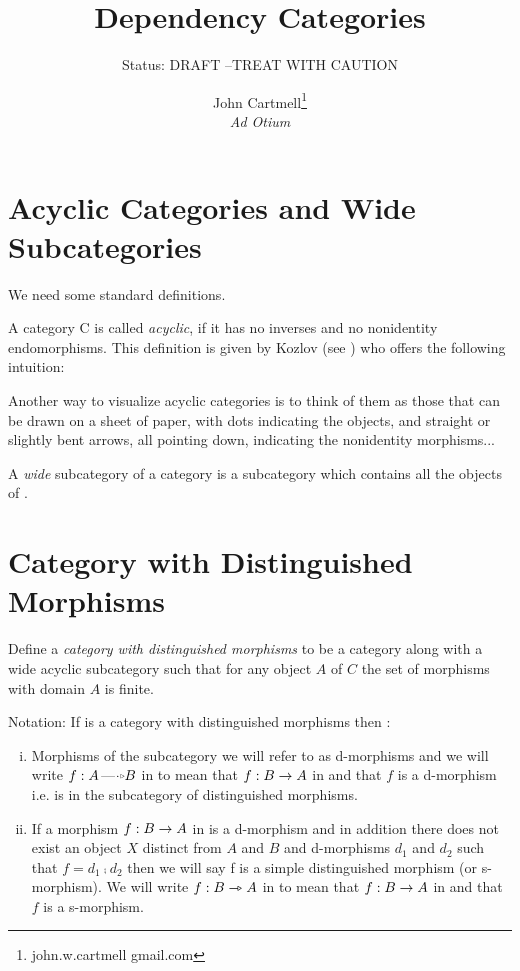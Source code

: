 \documentclass[10pt,a4paper]{scrartcl}
\title{Dependency Categories}
\author{John Cartmell\footnote{john.w.cartmell gmail.com}\\ \normalsize{\textit{Ad Otium}}}
\subtitle{Status: \normalsize{DRAFT --TREAT WITH CAUTION}}
\begin{document}
\maketitle

\section {Acyclic Categories and Wide Subcategories}
We need some standard definitions.

A category C is called \textit{acyclic}, if it has no inverses and no nonidentity
endomorphisms. This definition is given by Kozlov (see \cite{Kozlov2007}) who offers the following intuition:
\begin{erquote}
Another way to visualize acyclic categories is to think of them as those
that can be drawn on a sheet of paper, with dots indicating the objects, and
straight or slightly bent arrows, all pointing down, indicating the nonidentity
morphisms...
\end{erquote}
\noindent
A \textit{wide} subcategory of a category  is a subcategory which contains all the objects of .

\section{Category with Distinguished Morphisms}

\begin{definition}
Define a \textit{category with distinguished morphisms} to be a category  along with a wide acyclic subcategory  such that for any object $A$ of $C$ the set of morphisms with domain $A$ is finite.
\end{definition} 

\noindent
Notation:
If  is a category with distinguished morphisms then :
\begin{enumerate}[(i)]
\item Morphisms of the subcategory we will refer to as d-morphisms and we will write  
$f: A \dmorph B$ in 
to mean that 
$f: B \rightarrow A$ in  and that $f$ is a d-morphism i.e. is in the subcategory  of distinguished morphisms. 
\item If a morphism $f: B \rightarrow A$ in  is a d-morphism and in addition
there does not exist an object $X$ distinct from $A$ and $B$ and d-morphisms $d_1$ and $d_2$
such that $f=d_1 \comp d_2$ then we will say f is a simple distinguished morphism (or s-morphism). We will write  $f:B \rightarrowtriangle A$ in 
to mean that 
$f: B \rightarrow A$ in  and that $f$ is a s-morphism.
\end{enumerate}
\end{document}
